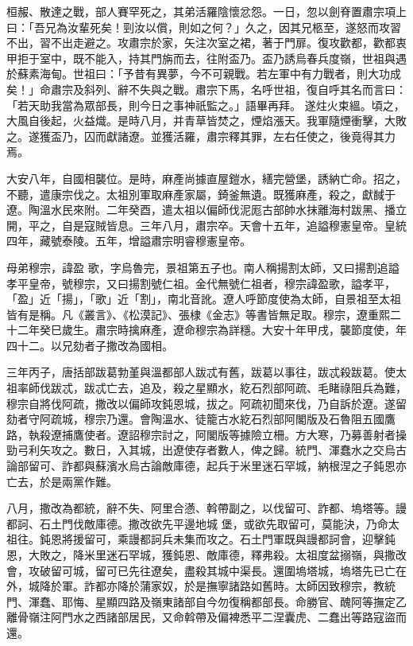\begin{pinyinscope}
 桓赧、散達之戰，部人賽罕死之，其弟活羅陰懷忿怨。一日，忽以劍脊置肅宗項上曰：「吾兄為汝輩死矣！剄汝以償，則如之何？」久之，因其兄柩至，遂怒而攻習不出，習不出走避之。攻肅宗於家，矢注次室之裙，著于門扉。復攻歡都，歡都衷甲拒于室中，既不能入，持其門旃而去，往附盃乃。盃乃誘烏春兵度嶺，世祖與遇於蘇素海甸。世祖曰：「予昔有異夢，今不可親戰。若左軍中有力戰者，則大功成矣！」命肅宗及斜列、辭不失與之戰。肅宗下馬，名呼世祖，復自呼其名而言曰：「若天助我當為眾部長，則今日之事神祇監之。」語畢再拜。
 遂炷火束縕。頃之，大風自後起，火益熾。是時八月，并青草皆焚之，煙焰漲天。我軍隨煙衝擊，大敗之。遂獲盃乃，囚而獻諸遼。並獲活羅，肅宗釋其罪，左右任使之，後竟得其力焉。



 大安八年，自國相襲位。是時，麻產尚據直屋鎧水，繕完營堡，誘納亡命。招之，不聽，遣康宗伐之。太祖別軍取麻產家屬，錡釜無遺。既獲麻產，殺之，獻馘于遼。陶溫水民來附。二年癸酉，遣太祖以偏師伐泥厖古部帥水抹離海村跋黑、播立開，平之，自是寇賊皆息。三年八月，肅宗卒。天會十五年，追謚穆憲皇帝。皇統四年，藏號泰陵。五年，增謚肅宗明睿穆憲皇帝。



 母弟穆宗，諱盈
 歌，字烏魯完，景祖第五子也。南人稱揚割太師，又曰揚割追謚孝平皇帝，號穆宗，又曰揚割號仁祖。金代無號仁祖者，穆宗諱盈歌，謚孝平，「盈」近「揚」，「歌」近「割」，南北音訛。遼人呼節度使為太師，自景祖至太祖皆有是稱。凡《叢言》、《松漠記》、張棣《金志》等書皆無足取。穆宗，遼重熙二十二年癸巳歲生。肅宗時擒麻產，遼命穆宗為詳穩。大安十年甲戌，襲節度使，年四十二。以兄劾者子撒改為國相。



 三年丙子，唐括部跋葛勃堇與溫都部人跋忒有舊，跋葛以事往，跋忒殺跋葛。使太祖率師伐跋忒，跋忒亡去，追及，殺之星顯水，紇石烈部阿疏、毛睹祿阻兵為難，
 穆宗自將伐阿疏，撒改以偏師攻鈍恩城，拔之。阿疏初聞來伐，乃自訴於遼。遂留劾者守阿疏城，穆宗乃還。會陶溫水、徒籠古水紇石烈部阿閣版及石魯阻五國鷹路，執殺遼捕鷹使者。遼詔穆宗討之，阿閣版等據險立柵。方大寒，乃募善射者操勁弓利矢攻之。數日，入其城，出遼使存者數人，俾之歸。統門、渾蠢水之交烏古論部留可、詐都與蘇濱水烏古論敵庫德，起兵于米里迷石罕城，納根涅之子鈍恩亦亡去，於是兩黨作難。



 八月，撒改為都統，辭不失、阿里合懣、斡帶副之，以伐留可、詐都、塢塔等。謾都訶、石土門伐敵庫德。撒改欲先平邊地城
 堡，或欲先取留可，莫能決，乃命太祖往。鈍恩將援留可，乘謾都訶兵未集而攻之。石土門軍既與謾都訶會，迎擊鈍恩，大敗之，降米里迷石罕城，獲鈍恩、敵庫德，釋弗殺。太祖度盆搦嶺，與撒改會，攻破留可城，留可已先往遼矣，盡殺其城中渠長。還圍塢塔城，塢塔先已亡在外，城降於軍。詐都亦降於蒲家奴，於是撫寧諸路如舊時。太師因致穆宗，教統門、渾蠢、耶悔、星顯四路及嶺東諸部自今勿復稱都部長。命勝官、醜阿等撫定乙離骨嶺注阿門水之西諸部居民，又命斡帶及偏裨悉平二涅囊虎、二蠢出等路寇盜而還。




\end{pinyinscope}
